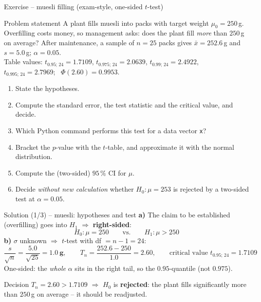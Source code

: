 \documentclass[aspectratio=169,11pt]{beamer}
\begin{document}
\begin{frame}{Exercise -- muesli filling (exam-style, one-sided $t$-test)}
  \begin{block}{Problem statement}
    A plant fills muesli into packs with target weight $\mu_0=250$\,g.
    Overfilling costs money, so management asks: does the plant fill
    \emph{more} than $250$\,g on average? After maintenance, a sample of
    $n=25$ packs gives $\bar x=252.6$\,g and $s=5.0$\,g; $\alpha=0.05$.\\[2pt]
    {\footnotesize Table values: $t_{0.95;\,24}=1.7109$, $t_{0.975;\,24}=2.0639$,
    $t_{0.99;\,24}=2.4922$, $t_{0.995;\,24}=2.7969$; \ $\Phi(2.60)=0.9953$.}
  \end{block}
  \begin{enumerate}\setlength{\itemsep}{1pt}
    \item[a)] State the hypotheses.
    \item[b)] Compute the standard error, the test statistic and the critical
              value, and decide.
    \item[c)] Which Python command performs this test for a data vector
              \texttt{x}?
    \item[d)] Bracket the $p$-value with the $t$-table, and approximate it with
              the normal distribution.
    \item[e)] Compute the (two-sided) $95\,\%$ CI for $\mu$.
    \item[f)] Decide \emph{without new calculation} whether $H_0:\mu=253$ is
              rejected by a two-sided test at $\alpha=0.05$.
  \end{enumerate}
\end{frame}

\begin{frame}{Solution (1/3) -- muesli: hypotheses and test}
  \textbf{a)} The claim to be established (overfilling) goes into $H_1$
  $\Rightarrow$ \textbf{right-sided}:
  \[
    H_0:\mu=250 \qquad\text{vs.}\qquad H_1:\mu>250
  \]
  \textbf{b)} $\sigma$ unknown $\Rightarrow$ $t$-test with df $=n-1=24$:
  \[
    \frac{s}{\sqrt n}=\frac{5.0}{\sqrt{25}}=\mathbf{1.0\ g},\qquad
    T_n=\frac{252.6-250}{1.0}=\mathbf{2.60},\qquad
    \text{critical value } t_{0.95;\,24}=\mathbf{1.7109}
  \]
  {\small One-sided: the \emph{whole} $\alpha$ sits in the right tail, so the
  $0.95$-quantile (not $0.975$).}
  \begin{alertblock}{Decision}
    $T_n=2.60>1.7109$ $\Rightarrow$ $H_0$ is \textbf{rejected}: the plant fills
    significantly more than $250$\,g on average -- it should be readjusted.
  \end{alertblock}
\end{frame}
\end{document}
